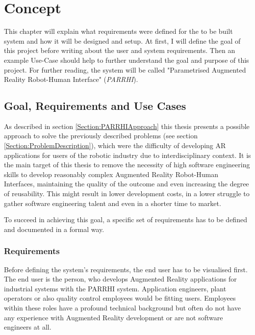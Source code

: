 \chapter{Concept}\label{Chap:Concept}

This chapter will explain what requirements were defined for the to be built system and how it will be designed and setup. At first, I will define the goal of this project before writing about the user and system requirements. Then an example Use-Case should help to further understand the goal and purpose of this project.  For further reading, the system will be called "Parametrised Augmented Reality Robot-Human Interface" (\textit{PARRHI}).

\section{Goal, Requirements and Use Cases}
As described in section \ref{Section:PARRHIApproach} this thesis presents a possible approach to solve the previously described problems (see section \ref{Section:ProblemDescription}), which were the difficulty of developing AR applications for users of the robotic industry due to interdisciplinary context. It is the main target of this thesis to remove the necessity of high software engineering skills to develop reasonably complex Augmented Reality Robot-Human Interfaces, maintaining the quality of the outcome and even increasing the degree of reusability. This might result in lower development costs, in a lower struggle to gather software engineering talent and even in a shorter time to market.

To succeed in achieving this goal, a specific set of requirements has to be defined and documented in a formal way.

\subsection{Requirements}\label{Section:Requirements}

Before defining the system's requirements, the end user has to be visualised first. The end user is the person, who develops Augmented Reality applications for industrial systems with the PARRHI system. Application engineers, plant operators or also quality control employees would be fitting users. Employees within these roles have a profound technical background but often do not have any experience with Augmented Reality development or are not software engineers at all.

